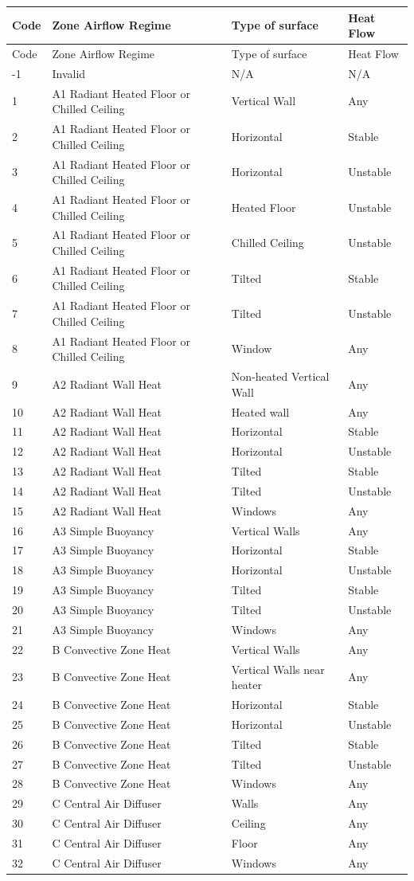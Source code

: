 \begin{longtable}[c]{p{1.5in}p{1.5in}p{1.5in}p{1.5in}}
\toprule
Code & Zone Airflow Regime & Type of surface & Heat Flow \tabularnewline
\midrule
\endfirsthead

\toprule
Code & Zone Airflow Regime & Type of surface & Heat Flow \tabularnewline
\midrule
\endhead

-1 & Invalid & N/A & N/A \tabularnewline
1 & A1 Radiant Heated Floor or Chilled Ceiling & Vertical Wall & Any \tabularnewline
2 & A1 Radiant Heated Floor or Chilled Ceiling & Horizontal & Stable \tabularnewline
3 & A1 Radiant Heated Floor or Chilled Ceiling & Horizontal & Unstable \tabularnewline
4 & A1 Radiant Heated Floor or Chilled Ceiling & Heated Floor & Unstable \tabularnewline
5 & A1 Radiant Heated Floor or Chilled Ceiling & Chilled Ceiling & Unstable \tabularnewline
6 & A1 Radiant Heated Floor or Chilled Ceiling & Tilted & Stable \tabularnewline
7 & A1 Radiant Heated Floor or Chilled Ceiling & Tilted & Unstable \tabularnewline
8 & A1 Radiant Heated Floor or Chilled Ceiling & Window & Any \tabularnewline
9 & A2 Radiant Wall Heat & Non-heated Vertical Wall & Any \tabularnewline
10 & A2 Radiant Wall Heat & Heated wall & Any \tabularnewline
11 & A2 Radiant Wall Heat & Horizontal & Stable \tabularnewline
12 & A2 Radiant Wall Heat & Horizontal & Unstable \tabularnewline
13 & A2 Radiant Wall Heat & Tilted & Stable \tabularnewline
14 & A2 Radiant Wall Heat & Tilted & Unstable \tabularnewline
15 & A2 Radiant Wall Heat & Windows & Any \tabularnewline
16 & A3 Simple Buoyancy & Vertical Walls & Any \tabularnewline
17 & A3 Simple Buoyancy & Horizontal & Stable \tabularnewline
18 & A3 Simple Buoyancy & Horizontal & Unstable \tabularnewline
19 & A3 Simple Buoyancy & Tilted & Stable \tabularnewline
20 & A3 Simple Buoyancy & Tilted & Unstable \tabularnewline
21 & A3 Simple Buoyancy & Windows & Any \tabularnewline
22 & B Convective Zone Heat & Vertical Walls & Any \tabularnewline
23 & B Convective Zone Heat & Vertical Walls near heater & Any \tabularnewline
24 & B Convective Zone Heat & Horizontal & Stable \tabularnewline
25 & B Convective Zone Heat & Horizontal & Unstable \tabularnewline
26 & B Convective Zone Heat & Tilted & Stable \tabularnewline
27 & B Convective Zone Heat & Tilted & Unstable \tabularnewline
28 & B Convective Zone Heat & Windows & Any \tabularnewline
29 & C Central Air Diffuser & Walls & Any \tabularnewline
30 & C Central Air Diffuser & Ceiling & Any \tabularnewline
31 & C Central Air Diffuser & Floor & Any \tabularnewline
32 & C Central Air Diffuser & Windows & Any \tabularnewline

\end{longtable}
